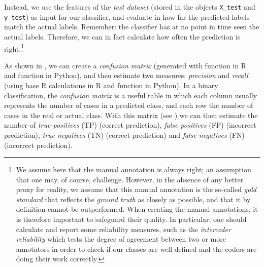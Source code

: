 Instead, we use the features of the \emph{test dataset} (stored in the objects  \texttt{X\_test} and \texttt{y\_test})  as input for
our classifier, and evaluate in how far the predicted labels match the
actual labels.  Remember: the classifier has at no point in time seen
the actual labels.  Therefore, we can in fact calculate how often the
prediction is right.\footnote{We assume here that the manual annotation
  is always right; an assumption that one may, of course,
  challenge. However, in the absence of any better proxy for reality,
  we assume that this manual annotation is the so-called \emph{gold
    standard} that reflects the \emph{ground truth} as closely as
  possible, and that it by definition cannot be outperformed. When creating the manual annotations, it is therefore important to safeguard their quality. In particular, one  should calculate and report some reliability measures, such as the \emph{intercoder reliability} which tests the degree of agreement between two or more annotators in order to check if our classes are well defined and the coders are doing their work correctly.}


As shown in , we can create a \emph{confusion matrix} (generated with  function  in R and  function  in Python), and then estimate two measures: \emph{precision} and \emph{recall} (using base R calculations in R and  function  in Python). In a binary classification, the \emph{confusion matrix} is a useful table in which each column usually represents the number of cases in a predicted class, and each row the number of cases in the real or actual class. With this matrix (see ) we can then estimate the number of \emph{true positives} (TP) (correct prediction), \emph{false positives} (FP) (incorrect prediction), \emph{true negatives} (TN) (correct prediction) and \emph{false negatives} (FN) (incorrect prediction).


